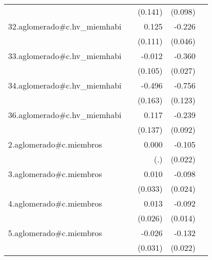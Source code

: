 {\begin{longtable}{l*{4}{D{.}{.}{-1}}}
            &                     &     (0.141)         &     (0.098)         &                     \\
\addlinespace
32.aglomerado#c.hv\_miemhabi&                     &       0.125         &      -0.226\sym{***}&                     \\
            &                     &     (0.111)         &     (0.046)         &                     \\
\addlinespace
33.aglomerado#c.hv\_miemhabi&                     &      -0.012         &      -0.360\sym{***}&                     \\
            &                     &     (0.105)         &     (0.027)         &                     \\
\addlinespace
34.aglomerado#c.hv\_miemhabi&                     &      -0.496\sym{**} &      -0.756\sym{***}&                     \\
            &                     &     (0.163)         &     (0.123)         &                     \\
\addlinespace
36.aglomerado#c.hv\_miemhabi&                     &       0.117         &      -0.239\sym{**} &                     \\
            &                     &     (0.137)         &     (0.092)         &                     \\
\addlinespace
2.aglomerado#c.miembros&                     &       0.000         &      -0.105\sym{***}&                     \\
            &                     &         (.)         &     (0.022)         &                     \\
\addlinespace
3.aglomerado#c.miembros&                     &       0.010         &      -0.098\sym{***}&                     \\
            &                     &     (0.033)         &     (0.024)         &                     \\
\addlinespace
4.aglomerado#c.miembros&                     &       0.013         &      -0.092\sym{***}&                     \\
            &                     &     (0.026)         &     (0.014)         &                     \\
\addlinespace
5.aglomerado#c.miembros&                     &      -0.026         &      -0.132\sym{***}&                     \\
            &                     &     (0.031)         &     (0.022)         &                     \\

\end{longtable}}
